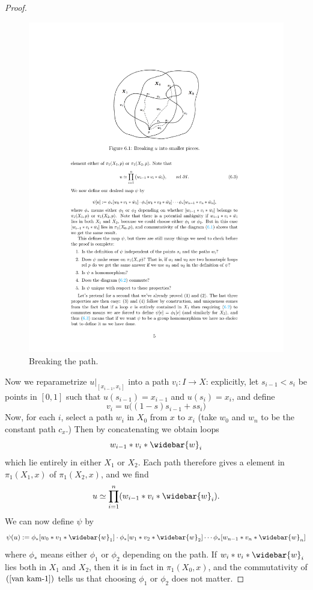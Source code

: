 \begin{proof}
\begin{figure}[htbp]
\includegraphics{pictures/vankampen-1.pdf}
\caption{Breaking the path.}
\end{figure}\par
Now we reparametrize $u|_{[x_{i-1},x_i]}$ into a path $v_i:I\to X$: explicitly, let $s_{i-1}<s_i$ be points in $[0,1]$ such that $u(s_{i-1})=x_{i-1}$ and $u(s_i)=x_i$, and define
\[v_i=u\big((1-s)s_{i-1}+ss_i\big)\]
Now, for each $i$, select a path $w_i$ in $X_0$ from $x$ to $x_i$ (take $w_0$ and $w_n$ to be the constant path $c_x$.) Then by concatenating we obtain loops
\[w_{i-1}\ast v_i\ast\widebar{w}_i\]
which lie entirely in either $X_1$ or $X_2$. Each path therefore gives a element in $\pi_1(X_1,x)$ of $\pi_1(X_2,x)$, and we find
\[u\simeq\prod_{i=1}^{n}(w_{i-1}\ast v_i\ast\widebar{w}_i).\]
We can now define $\psi$ by
\[\psi(u):=\phi_*[w_0\ast v_1\ast\widebar{w}_1]\cdot\phi_*[w_1\ast v_2\ast\widebar{w}_2]\cdots\phi_*[w_{n-1}\ast v_n\ast\widebar{w}_n]\]
where $\phi_*$ means either $\phi_1$ or $\phi_2$ depending on the path. If $w_i\ast v_i\ast\widebar{w}_{i}$ lies both in $X_1$ and $X_2$, then it is in fact in $\pi_1(X_0,x)$, and the commutativity of $(\ref{van kam-1})$ tells us that choosing $\phi_1$ or $\phi_2$ does not matter.\par

\end{proof}
